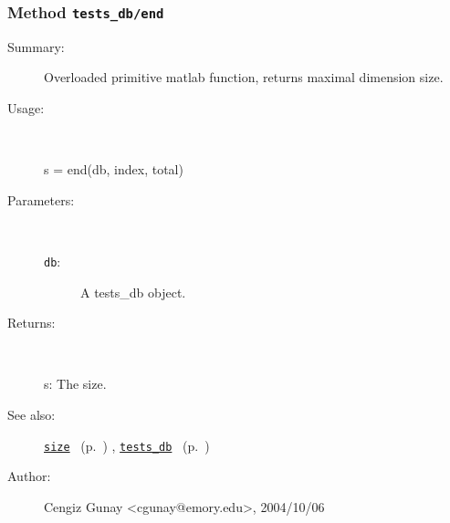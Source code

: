 \subsubsection[Method \texttt{end}]{Method \texttt{tests\_db/end}}%
%
\label{ref_tests_db__end}%
\hypertarget{ref_tests_db__end}{}%
\begin{description}
\item[Summary:]Overloaded primitive matlab function, returns maximal dimension size.
%
\item[Usage:]~%
\begin{lyxcode}%
s = end(db, index, total)
%
\end{lyxcode}%
%
%
\item[Parameters:]~
\begin{description}%
\item[\texttt{db}:]
 A tests\_db object.
\end{description}%
%
\item[Returns:
]~

	s: The size.
%
%
\item[See also:]%
\hyperlink{ref_size}{\texttt{size}}%
\ (p.~\pageref{ref_size})%
%
, \hyperlink{ref_tests_db}{\texttt{tests\_db}}%
\ (p.~\pageref{ref_tests_db})%
%
%
\item[Author:]%
Cengiz Gunay <cgunay@emory.edu>, 2004/10/06
%
\end{description}
\methodline%
